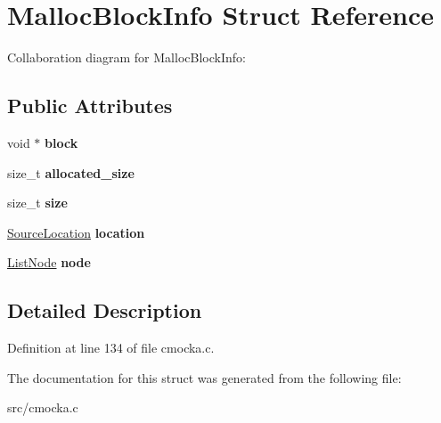 \hypertarget{structMallocBlockInfo}{}\section{Malloc\+Block\+Info Struct Reference}
\label{structMallocBlockInfo}


Collaboration diagram for Malloc\+Block\+Info\+:
\subsection*{Public Attributes}
\begin{DoxyCompactItemize}
\item 
\mbox{\label{structMallocBlockInfo_aaca8b34ff6f79f4454bba197a21a52e7}} 
void $\ast$ {\bfseries block}
\item 
\mbox{\label{structMallocBlockInfo_a103783e0ba99bc5360f69c3b30a39048}} 
size\+\_\+t {\bfseries allocated\+\_\+size}
\item 
\mbox{\label{structMallocBlockInfo_a7d069f95b78b4e068752abc6277b786b}} 
size\+\_\+t {\bfseries size}
\item 
\mbox{\label{structMallocBlockInfo_af1a66bb07ef7e53441b7fca1c6c61906}} 
\hyperlink{structSourceLocation}{Source\+Location} {\bfseries location}
\item 
\mbox{\label{structMallocBlockInfo_ae4628c67b78874f1569ec84bf8978b91}} 
\hyperlink{structListNode}{List\+Node} {\bfseries node}
\end{DoxyCompactItemize}


\subsection{Detailed Description}


Definition at line 134 of file cmocka.\+c.



The documentation for this struct was generated from the following file\+:\begin{DoxyCompactItemize}
\item 
src/cmocka.\+c\end{DoxyCompactItemize}
